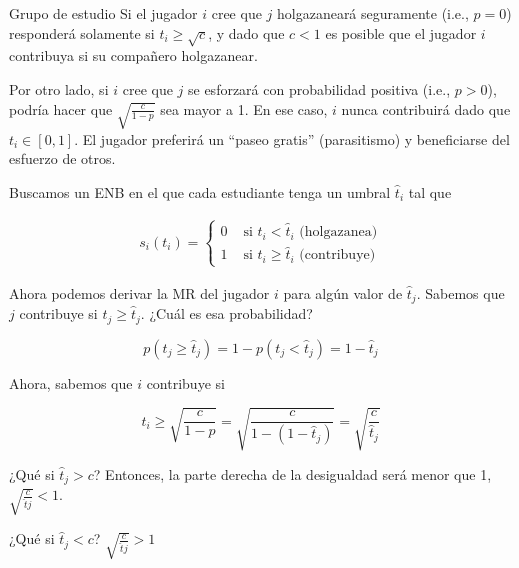 \documentclass[12pt]{article}
\begin{document}
\begin{exbox}{Grupo de estudio}
	Si el jugador $ i $ cree que $ j $ holgazaneará seguramente (i.e., $ p=0 $) responderá solamente si $ t_i \geq \sqrt{c} $, y dado que $ c<1 $ es posible que el jugador $ i $ contribuya si su compañero holgazanear.

	Por otro lado, si $ i $ cree que $ j $ se esforzará con probabilidad positiva (i.e., $ p > 0 $), podría hacer que $ \sqrt{\frac{c}{1-p}} $ sea mayor a 1. En ese caso, $ i $ nunca contribuirá dado que $ t_i \in [0, 1] $. El jugador preferirá un ``paseo gratis'' (parasitismo) y beneficiarse del esfuerzo de otros.

	Buscamos un ENB en el que cada estudiante tenga un umbral $ \hat{t}_i $ tal que

	\begin{align*}
		s_i(t_i)=\begin{cases}
			         0 & \text{ si } t_i < \hat{t}_i \text{ (holgazanea)}    \\
			         1 & \text{ si } t_i \geq \hat{t}_i \text{ (contribuye)}
		         \end{cases}
	\end{align*}

	Ahora podemos derivar la MR del jugador $ i $ para algún valor de  $ \hat{t}_j $.
	Sabemos que $ j $ contribuye si $ t_j \geq \hat{t}_j $. ¿Cuál es esa probabilidad?

	$$ p(t_j \geq \hat{t}_j ) = 1 - p(t_j < \hat{t}_j) = 1-\hat{t}_j$$

	\begin{center}
	\end{center}

	Ahora, sabemos que $i$ contribuye si

	$$ t_i \geq \sqrt{\frac{c}{1-p}} = \sqrt{\frac{c}{1-(1-\hat{t}_j)}} = \sqrt{\frac{c}{\hat{t}_j}}$$

	\begin{myitemize}
		\item ¿Qué si $ \hat{t}_j > c $? Entonces, la parte derecha de la desigualdad será menor que 1, $ \sqrt{\frac{c}{\hat{t}j}} <1 $.
		\item ¿Qué si $ \hat{t}_j < c $? $ \sqrt{\frac{c}{\hat{t}j}} > 1 $
	\end{myitemize}


\end{exbox}
\end{document}
